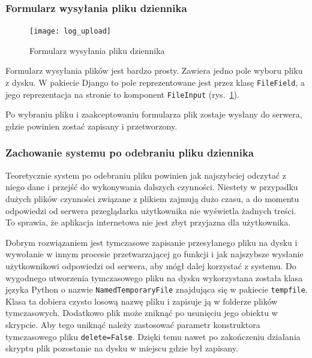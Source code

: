\documentclass[]{mgr}
\begin{document}
                \subsubsection{Formularz wysyłania pliku dziennika}
                \begin{figure}
                    \vspace{-30pt}
                    \begin{center}
                        \texttt{[image: log\_upload]}
                    \end{center}
                    \vspace{-20pt}
                    \caption{Formularz wysyłania pliku dziennika}
                    \vspace{-10pt}
                    \label{fig:log_upload}
                \end{figure}
                Formularz wysyłania plików jest bardzo prosty. Zawiera jedno pole wyboru pliku z dysku. W pakiecie Django to pole reprezentowane jest przez klasę \texttt{FileField}, a jego reprezentacja na stronie to komponent \texttt{FileInput} (rys.~\ref{fig:log_upload}).

                Po wybraniu pliku i zaakceptowaniu formularza plik zostaje wysłany do serwera, gdzie powinien zostać zapisany i przetworzony.

                \subsubsection{Zachowanie systemu po odebraniu pliku dziennika}
                Teoretycznie system po odebraniu pliku powinien jak najszybciej odczytać z niego dane i przejść do wykonywania dalszych czynności. Niestety w przypadku dużych plików czynności związane z plikiem zajmują dużo czasu, a do momentu odpowiedzi od serwera przeglądarka użytkownika nie wyświetla żadnych treści. To sprawia, że aplikacja internetowa nie jest zbyt przyjazna dla użytkownika.

                Dobrym rozwiązaniem jest tymczasowe zapisanie przesyłanego pliku na dysku i wywołanie w innym procesie przetwarzającej go funkcji i jak najszybsze wysłanie użytkownikowi odpowiedzi od serwera, aby mógł dalej korzystać z systemu. Do wygodnego utworzenia tymczasowego pliku na dysku wykorzystana została klasa języka Python o nazwie \texttt{NamedTemporaryFile} znajdująca się w pakiecie \texttt{tempfile}. Klasa ta dobiera czysto losową nazwę pliku i zapisuje ją w folderze plików tymczasowych. Dodatkowo plik może zniknąć po usunięciu jego obiektu w skrypcie. Aby tego uniknąć należy zastosować parametr konstruktora tymczasowego pliku \texttt{delete=False}. Dzięki temu nawet po zakończeniu działania skryptu plik pozostanie na dysku w miejscu gdzie był zapisany.
\end{document}
